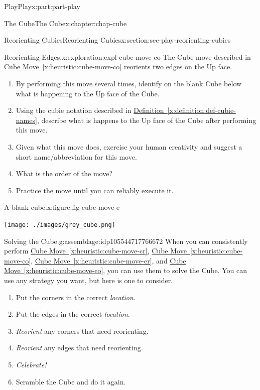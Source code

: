 \documentclass[oneside,10pt,]{book}
\newcommand{\xreffont}{\relax}
\numberwithin{equation}{section}
\begin{document}
\begin{partptx}{Play}{}{Play}{}{}{x:part:part-play}
\begin{chapterptx}{The Cube}{}{The Cube}{}{}{x:chapter:chap-cube}
\begin{sectionptx}{Reorienting Cubies}{}{Reorienting Cubies}{}{}{x:section:sec-play-reorienting-cubies}
\begin{exploration}{Reorienting Edges.}{x:exploration:expl-cube-move-co}
The Cube move described in \hyperref[x:heuristic:cube-move-co]{Cube Move~{\xreffont\ref{x:heuristic:cube-move-co}}} reorients two edges on the Up face.%
%
\begin{enumerate}
\item{}By performing this move several times, identify on the blank Cube below what is happening to the Up face of the Cube.%
\item{}Using the cubie notation described in \hyperref[x:definition:def-cubie-names]{Definition~{\xreffont\ref{x:definition:def-cubie-names}}}, describe what is happens to the Up face of the Cube after performing this move.%
\item{}Given what this move does, exercise your human creativity and suggest a short name\slash{}abbreviation for this move.%
\item{}What is the order of the move?%
\item{}Practice the move until you can reliably execute it.%
\end{enumerate}
\begin{figureptx}{A blank cube.}{x:figure:fig-cube-move-e}{}%
\begin{image}{0.25}{0.5}{0.25}%
\texttt{[image: ./images/grey\_cube.png]}
\end{image}%
\tcblower
\end{figureptx}%
\end{exploration}%
\begin{assemblage}{Solving the Cube.}{g:assemblage:idp105544717766672}%
When you can consistently perform \hyperref[x:heuristic:cube-move-cr]{Cube Move~{\xreffont\ref{x:heuristic:cube-move-cr}}}, \hyperref[x:heuristic:cube-move-co]{Cube Move~{\xreffont\ref{x:heuristic:cube-move-co}}}, \hyperref[x:heuristic:cube-move-er]{Cube Move~{\xreffont\ref{x:heuristic:cube-move-er}}}, and \hyperref[x:heuristic:cube-move-eo]{Cube Move~{\xreffont\ref{x:heuristic:cube-move-eo}}}, you can use them to solve the Cube. You can use any strategy you want, but here is one to consider.%
\begin{enumerate}
\item{}Put the corners in the correct \emph{location}.%
\item{}Put the edges in the correct \emph{location}.%
\item{}\emph{Reorient} any corners that need reorienting.%
\item{}\emph{Reorient} any edges that need reorienting.%
\item{}\emph{Celebrate!}%
\item{}Scramble the Cube and do it again.%

\end{enumerate}
\end{assemblage}
\end{sectionptx}
\end{chapterptx}
\end{partptx}
\end{document}
